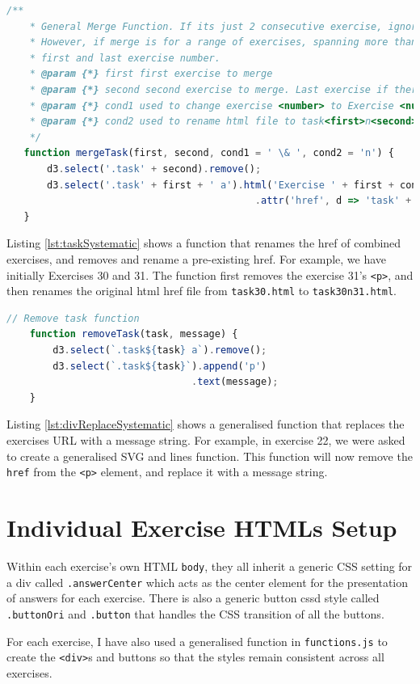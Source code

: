 \documentclass{scrreprt}
\begin{document}
\begin{lstlisting}[language=JavaScript,
    caption={Systematic URL Removal},
    captionpos=b,
    label={lst:taskSystematic}]
    /**
    * General Merge Function. If its just 2 consecutive exercise, ignore 3rd and 4th parameter. 
    * However, if merge is for a range of exercises, spanning more than 2, only enter the 
    * first and last exercise number.
    * @param {*} first first exercise to merge
    * @param {*} second second exercise to merge. Last exercise if there are more than 2 exercises.
    * @param {*} cond1 used to change exercise <number> to Exercise <number> to <number>
    * @param {*} cond2 used to rename html file to task<first>n<second>.html
    */
   function mergeTask(first, second, cond1 = ' \& ', cond2 = 'n') {
       d3.select('.task' + second).remove();
       d3.select('.task' + first + ' a').html('Exercise ' + first + cond1 + second)
                                           .attr('href', d => 'task' + first + cond2 + second + '.html');
   }
\end{lstlisting}
Listing \ref{lst:taskSystematic} shows a function that renames the href of combined exercises,
and removes and rename a pre-existing href. For example, we have initially Exercises 30 and 31.
The function first removes the exercise 31's \verb|<p>|, and then renames the original html href file
from \verb|task30.html| to \verb|task30n31.html|.\\

\begin{lstlisting}[language=JavaScript,
    caption={Systematic <a>-text Replacement},
    captionpos=b,
    label={lst:divReplaceSystematic}]
    // Remove task function
    function removeTask(task, message) {
        d3.select(`.task${task} a`).remove();
        d3.select(`.task${task}`).append('p')
                                .text(message);
    }
\end{lstlisting}
Listing \ref{lst:divReplaceSystematic} shows a generalised function that replaces the exercises URL
with a message string. For example, in exercise 22, we were asked to create a generalised SVG and
lines function. This function will now remove the \verb|href| from the \verb|<p>| element, and replace
it with a message string.


\newpage
\section{Individual Exercise HTMLs Setup}
Within each exercise's own HTML \verb|body|, they all inherit a generic CSS setting for a div called
\verb|.answerCenter| which acts as the center element for the presentation of answers for each
exercise. There is also a generic button cssd style called \verb|.buttonOri| and \verb|.button| that
handles the CSS transition of all the buttons. \\
\par For each exercise, I have also used a generalised function in \verb|functions.js| to create the
\verb|<div>|s and buttons so that the styles remain consistent across all exercises. 
\end{document}

